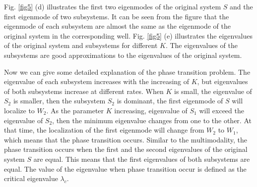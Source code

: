 \documentclass[a4paper,11pt]{article}
\begin{document}
Fig. \ref{fig5} (d) illustrates the first two eigenmodes of the original system $S$ and the first eigenmode of two subsystems. It can be seen from the figure that the eigenmode of each subsystem are almost the same as the eigenmode of the original system in the corresponding well. Fig. \ref{fig5} (e) illustrates the eigenvalues of the original system and subsystems for different $K$. The eigenvalues of the subsystems are good approximations to the eigenvalues of the original system.

Now we can give some detailed explanation of the phase transition problem. The eigenvalue of each subsystem increases with the increasing of $K$, but eigenvalues of both subsystems increase at different rates. When $K$ is small, the eigenvalue of $S_2$ is smaller, then the subsystem $S_2$ is dominant, the first eigenmode of $S$ will localize to $W_2$. As the parameter $K$ increasing, eigenvalue of $S_1$ will exceed the eigenvalue of $S_2$, then the minimum eigenvalue changes from one to the other. At that time, the localization of the first eigenmode will change from $W_2$ to $W_1$, which means that the phase transition occurs. Similar to the multimodality, the phase transition occurs when the first and the second eigenvalues of the original system $S$ are equal. This means that the first eigenvalues of both subsystems are equal. The value of the eigenvalue when phase transition occur is defined as the critical eigenvalue $\lambda_c$.
\end{document}
